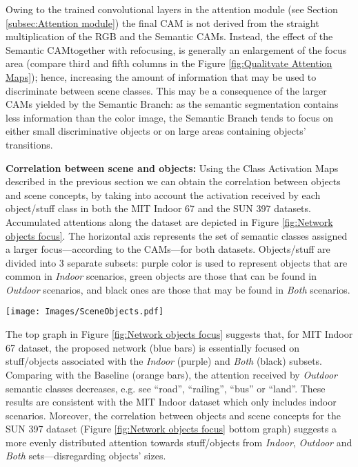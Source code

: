 \documentclass[review, 3p, sort&compress]{elsarticle}
\begin{document}
Owing to the trained convolutional layers in the attention module (see Section \ref{subsec:Attention module}) the final CAM is not derived from the straight multiplication of the RGB and the Semantic CAMs. Instead, the effect of the Semantic CAM\textemdash together with refocusing, is generally an enlargement of the focus area (compare third and fifth columns in the Figure \ref{fig:Qualitvate Attention Maps}); hence, increasing the amount of information that may be used to discriminate between scene classes. This may be a consequence of the larger CAMs yielded by the Semantic Branch: as the semantic segmentation contains less information than the color image, the Semantic Branch tends to focus on either small discriminative objects or on large areas containing objects' transitions.

\textbf{Correlation between scene and objects:}
Using the Class Activation Maps described in the previous section we can obtain the correlation between objects and scene concepts, by  taking into account the activation received by each object/stuff class in both the MIT Indoor 67 and the SUN 397 datasets. Accumulated attentions along the dataset are depicted in Figure \ref{fig:Network objects focus}. The horizontal axis represents the set of semantic classes assigned a larger focus---according to the CAMs---for both datasets. Objects/stuff are divided into 3 separate subsets: purple color is used to represent objects that are common in \textit{Indoor} scenarios, green objects are those that can be found in \textit{Outdoor} scenarios, and black ones are those that may be found in \textit{Both} scenarios.


\begin{figure*}[t!]
    \centering
    \texttt{[image: Images/SceneObjects.pdf]}
    \caption{Correlation between objects and scene concepts in both MIT Indoor 67 (top bar graph) and SUN 397 datasets (bottom bar graph) for ResNet-18 Baseline and for the proposed method (Ours). Objects/stuff are divided into 3 separate subsets. Purple color is used to represent objects that are \textit{Indoors}, green objects are \textit{Outdoors}, and black ones are those that lie in \textit{Both} indoors and outdoors. Better viewed in color.}
    \label{fig:Network objects focus}
\end{figure*}

The top graph in Figure \ref{fig:Network objects focus} suggests that, for MIT Indoor 67 dataset, the proposed network (blue bars) is essentially focused on stuff/objects associated with the \textit{Indoor} (purple) and \textit{Both} (black) subsets. Comparing with the Baseline (orange bars), the attention received by \textit{Outdoor} semantic classes decreases, e.g. see  ``road'', ``railing'', ``bus'' or ``land''. These results are consistent with the MIT Indoor dataset which only includes indoor scenarios. Moreover, the correlation between objects and scene concepts  for the SUN 397 dataset (Figure \ref{fig:Network objects focus} bottom graph) suggests a more evenly distributed attention towards stuff/objects from \textit{Indoor}, \textit{Outdoor} and \textit{Both} sets---disregarding objects' sizes.
\end{document}
